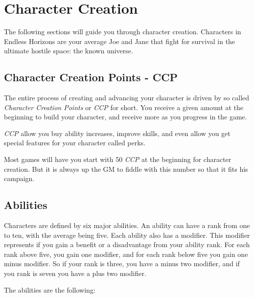 \chapter{Character Creation}
\label{chap:Character Creation}

The following sections will guide you through character creation. Characters
in Endless Horizons are your average Joe and Jane that fight for survival
in the ultimate hostile space: the known universe.

\section{Character Creation Points - CCP}
\label{sec:2-Character Creation Points}

The entire process of creating and advancing your character is driven by so
called \emph{Character Creation Points} or \emph{CCP} for short. You receive
a given amount at the beginning to build your character, and receive more as
you progress in the game.

\emph{CCP} allow you buy ability increases, improve skills, and even allow you
get special features for your character called perks.

Most games will have you start with 50 \emph{CCP} at the beginning for character
creation. But it is always up the GM to fiddle with this number so that it fits
his campaign.

\section{Abilities}
\label{sec:2-Abilities}

Characters are defined by six major abilities. An ability can have a rank from
one to ten, with the average being five. Each ability also has a modifier. This
modifier represents if you gain a benefit or a disadvantage from your ability
rank. For each rank above five, you gain one modifier, and for each rank below
five you gain one minus modifier. So if your rank is three, you have a minus
two modifier, and if you rank is seven you have a plus two modifier.

The abilities are the following:

